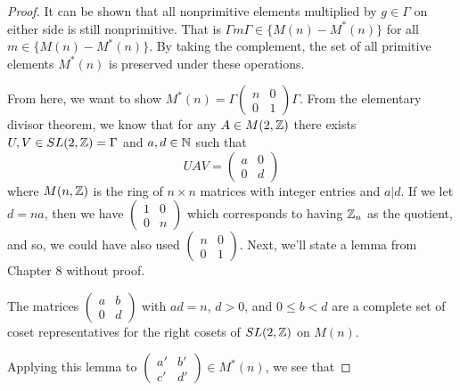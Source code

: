 \documentclass[a4paper]{article}
\begin{document}
\begin{proof}
    It can be shown that all nonprimitive elements multiplied by $g \in \Gamma$ on either side
    is still nonprimitive. That is $\Gamma m \Gamma \in \{M(n) - M^*(n)\}$ for all $m \in \{M(n)-M^*(n)\}$.
    By taking the complement, the set of all primitive elements $M^*(n)$ is preserved under these operations.
    
    From here, we want to show $M^*(n) = \Gamma\begin{pmatrix}
        n & 0 \\ 0 & 1
    \end{pmatrix}\Gamma$. From the elementary divisor theorem, we know that for any $A \in M(2,\mathbb{Z})$
    there exists $U,V \in SL(2,\mathbb{Z}) = \Gamma$ and $a,d \in \mathbb{N}$ such that 
    \[UAV = \begin{pmatrix}
        a & 0 \\ 0 & d
    \end{pmatrix}\]
    where $M(n,\mathbb{Z})$ is the ring of $n \times n $ matrices with integer entries and $a | d$.
    If we let $d = na$, then we have $\begin{pmatrix}
        1 & 0 \\ 0 & n
    \end{pmatrix}$ which corresponds to having $\mathbb{Z}_n$ as the quotient, and so, we could have also used $\begin{pmatrix}
        n & 0 \\ 0 & 1
    \end{pmatrix}$. Next, we'll state a lemma from Chapter 8 without proof.
    \begin{lemma}
        The matrices $\begin{pmatrix}
            a & b \\ 0 & d
        \end{pmatrix}$ with $ad=n$, $d > 0$, and $0 \leq b < d$ are a complete set of coset representatives
        for the right cosets of $SL(2,\mathbb{Z})$ on $M(n)$.
    \end{lemma}
    Applying this lemma to $\begin{pmatrix}
        a' & b' \\ c' & d'
    \end{pmatrix} \in M^*(n)$, we see that   
\end{proof}
\end{document}
